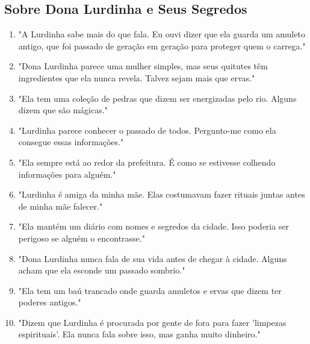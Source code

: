 \subsection*{Sobre Dona Lurdinha e Seus Segredos}
\begin{enumerate}
    \item "A Lurdinha sabe mais do que fala. Eu ouvi dizer que ela guarda um amuleto antigo, que foi passado de geração em geração para proteger quem o carrega."
    \item "Dona Lurdinha parece uma mulher simples, mas seus quitutes têm ingredientes que ela nunca revela. Talvez sejam mais que ervas."
    \item "Ela tem uma coleção de pedras que dizem ser energizadas pelo rio. Alguns dizem que são mágicas."
    \item "Lurdinha parece conhecer o passado de todos. Pergunto-me como ela consegue essas informações."
    \item "Ela sempre está ao redor da prefeitura. É como se estivesse colhendo informações para alguém."
    \item "Lurdinha é amiga da minha mãe. Elas costumavam fazer rituais juntas antes de minha mãe falecer."
    \item "Ela mantém um diário com nomes e segredos da cidade. Isso poderia ser perigoso se alguém o encontrasse."
    \item "Dona Lurdinha nunca fala de sua vida antes de chegar à cidade. Alguns acham que ela esconde um passado sombrio."
    \item "Ela tem um baú trancado onde guarda amuletos e ervas que dizem ter poderes antigos."
    \item "Dizem que Lurdinha é procurada por gente de fora para fazer 'limpezas espirituais'. Ela nunca fala sobre isso, mas ganha muito dinheiro."
\end{enumerate}

